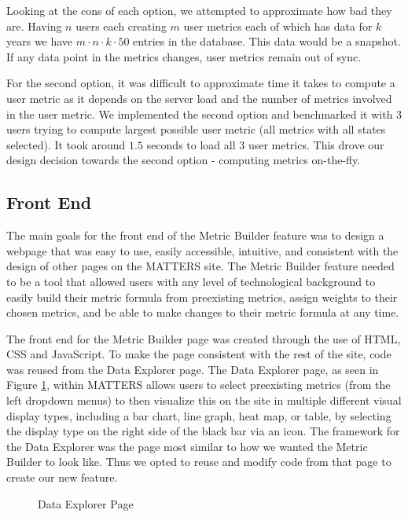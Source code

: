 			Looking at the cons of each option, we attempted to approximate how bad they are.
			Having $n$ users each creating $m$ user metrics each of which has data for $k$ years
			we have $m \cdot n \cdot k \cdot 50$ entries in the database.
			This data would be a snapshot. If any data point in the metrics changes, user metrics remain out of sync.

			For the second option, it was difficult to approximate time it takes to compute a user metric 
			as it depends on the server load and the number of metrics involved in the user metric. 
			We implemented the second option and benchmarked it with $3$ users trying to compute 
			largest possible user metric (all metrics with all states selected). 
			It took around $1.5$ seconds to load all $3$ user metrics. 
			This drove our design decision towards the second option - computing metrics on-the-fly.

		\subsection{Front End}
		
			The main goals for the front end of the Metric Builder feature was to design a webpage 
			that was easy to use, easily accessible, intuitive, and consistent 
			with the design of other pages on the MATTERS site. 
			The Metric Builder feature needed to be a tool that allowed users with any level of 
			technological background to easily build their metric formula from preexisting metrics, 
			assign weights to their chosen metrics, and be able to make changes to their metric formula at any time.
			
			The front end for the Metric Builder page was created through the use of HTML, CSS and JavaScript. 
			To make the page consistent with the rest of the site, code was reused from the Data Explorer page. 
			The Data Explorer page, as seen in Figure \ref{fig:dataexplorer}, within MATTERS allows users to select 
			preexisting metrics (from the left dropdown menus) to then visualize this on the site in multiple different visual display types, 
			including a bar chart, line graph, heat map, or table, by selecting the display type on the right side of the black bar via an icon. The framework for the 
			Data Explorer was the page most similar to how we wanted the Metric Builder to look like. Thus we opted to 
			reuse and modify code from that page to create our new feature. 
			
			\begin{figure}[t]
				\centering
					\caption{Data Explorer Page}
				\label{fig:dataexplorer}
			\end{figure}
			
